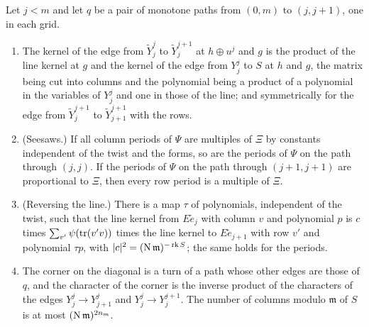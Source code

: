 \begin{lemma}\label{lem:diagonal-turn}
Let $j<m$ and let $q$ be a pair of monotone paths from $(0,m)$ to $(j,j+1)$, one in each grid.
\begin{enumerate}[label=\textup{(\alph*)}]
\item The kernel of the edge from $\tilde Y^j_j$ to $\tilde Y^{j+1}_j$ at $h\oplus u^j$ and $g$ is the product of the line kernel at $g$ and the kernel of the edge from $Y^j_j$ to $S$ at $h$ and $g$, the matrix being cut into columns and the polynomial
being a product of a polynomial in the variables of $Y^j_j$ and one in those of the line; and symmetrically for the edge from $\tilde Y^{j+1}_j$ to $\tilde Y^{j+1}_{j+1}$ with the rows.
\item (Seesaws.) If all column periods of $\Psi$ are multiples of $\Xi$ by constants independent of the twist and the forms, so are the periods of $\Psi$ on the path through $(j,j)$. If the periods of $\Psi$ on the path through $(j+1,j+1)$
are proportional to $\Xi$, then every row period is a multiple of $\Xi$.
\item (Reversing the line.) There is a map $\tau$ of polynomials, independent of the twist, such that the line kernel from $E\tilde e_j$ with column $v$ and polynomial $p$ is $c$ times $\sum_{v'}\psi(\operatorname{tr}(v'v))$ times the line kernel to $E\tilde e_{j+1}$ with
row $v'$ and polynomial $\tau p$, with $\lvert c\rvert^2=(\operatorname{N}\mathfrak m)^{-\operatorname{rk}S}$; the same holds for the periods.
\item The corner on the diagonal is a turn of a path whose other edges are those of $q$, and the character of the corner is the inverse product of the characters of the edges $Y^j_j\to Y^j_{j+1}$ and $Y^j_j\to Y^{j+1}_j$. The number of columns
modulo $\mathfrak m$ of $S$ is at most $(\operatorname{N}\mathfrak m)^{2n_m}$.
\end{enumerate}
\end{lemma}

